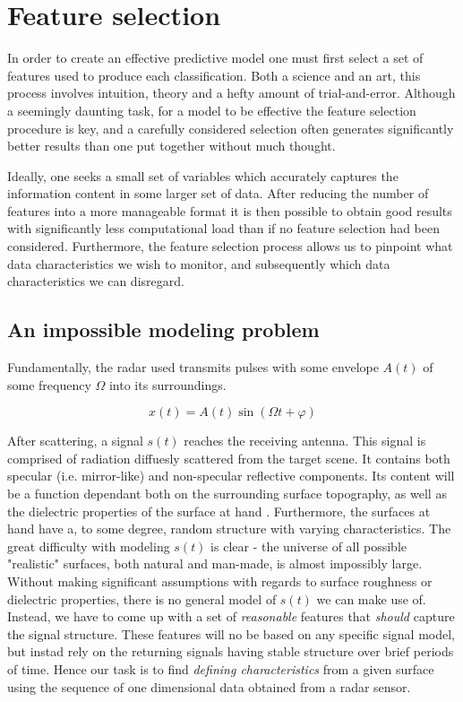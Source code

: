 \chapter{Feature selection}

In order to create an effective predictive model one must first select a set of features used to produce each classification. Both a science and an art, this process involves intuition, theory and a hefty amount of trial-and-error. Although a seemingly daunting task, for a model to be effective the feature selection procedure is key, and a carefully considered selection often generates significantly better results than one put together without much thought. 

Ideally, one seeks a small set of variables which accurately captures the information content in some larger set of data. After reducing the number of features into a more manageable format it is then possible to obtain good results with significantly less computational load than if no feature selection had been considered. Furthermore, the feature selection process allows us to pinpoint what data characteristics we wish to monitor, and subsequently which data characteristics we can disregard. 

\section{An impossible modeling problem}

Fundamentally, the radar used transmits pulses with some envelope $A(t)$ of some frequency $\Omega$ into its surroundings.

\begin{equation}
	x(t) = A(t)\sin(\Omega t + \varphi)
\end{equation}

After scattering, a signal $s(t)$ reaches the receiving antenna. This signal is comprised of radiation diffuesly scattered from the target scene. It contains both specular (i.e. mirror-like) and non-specular reflective components. Its content will be a function dependant both on the surrounding surface topography, as well as the dielectric properties of the surface at hand \citep{grossman_popovic_chamberlin_gordon_novotny_2017}. Furthermore, the surfaces at hand have a, to some degree, random structure with varying characteristics. The great difficulty with modeling $s(t)$ is clear - the universe of all possible "realistic" surfaces, both natural and man-made, is almost impossibly large. Without making significant assumptions with regards to surface roughness or dielectric properties, there is no general model of $s(t)$ we can make use of. Instead, we have to come up with a set of \emph{reasonable} features that \emph{should} capture the signal structure. These features will no be based on any specific signal model, but instad rely on the returning signals having stable structure over brief periods of time. Hence our task is to find \emph{defining characteristics} from a given surface using the sequence of one dimensional data obtained from a radar sensor. 


